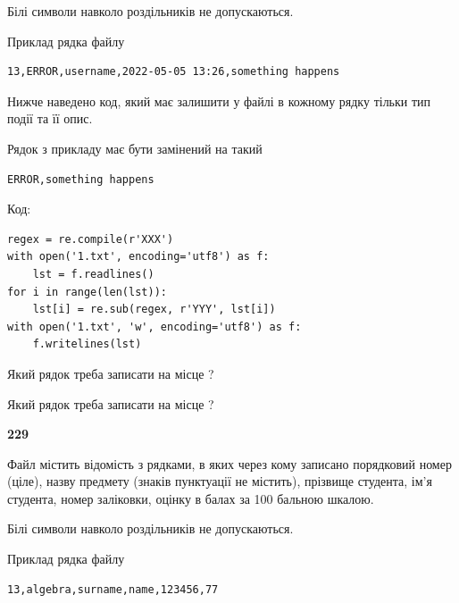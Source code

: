 Білі символи навколо роздільників не допускаються.

Приклад рядка файлу



\begin{verbatim}
13,ERROR,username,2022-05-05 13:26,something happens
\end{verbatim}


Нижче наведено код, який має залишити у файлі в кожному рядку тільки тип події та її опис.

Рядок з прикладу має бути замінений на такий



\begin{verbatim}
ERROR,something happens
\end{verbatim}




Код:



\begin{verbatim}
regex = re.compile(r'XXX')
with open('1.txt', encoding='utf8') as f:
    lst = f.readlines()
for i in range(len(lst)):
    lst[i] = re.sub(regex, r'YYY', lst[i])
with open('1.txt', 'w', encoding='utf8') as f:
    f.writelines(lst)
\end{verbatim}









Який рядок треба записати на місце  ?\par
\vspace{5mm}


Який рядок треба записати на місце  ?\par


\newpage

{\begin {center}\textbf{ 229}\end {center}}\par
Файл  містить відомість з рядками, в яких через кому записано поряд\-ковий номер (ціле), назву предмету (знаків пунктуації не містить), прізвище студента, ім'я студента, номер заліковки, оцінку в балах за 100 бальною шкалою.

Білі символи навколо роздільників не допускаються.

Приклад рядка файлу



\begin{verbatim}
13,algebra,surname,name,123456,77
\end{verbatim}


